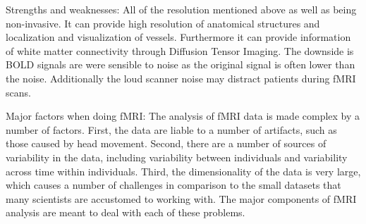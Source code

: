 Strengths and weaknesses: All of the resolution mentioned above as well as being non-invasive. It can provide high resolution of anatomical structures and localization and visualization of vessels. Furthermore it can provide information of white matter connectivity through Diffusion Tensor Imaging. The downside is BOLD signals are were sensible to noise as the original signal is often lower than the noise. Additionally the loud scanner noise may distract patients during fMRI scans. 
\cite{Glover2011}

Major factors when doing fMRI:
The analysis of fMRI data is made complex by a number of factors. First, the data are liable to a number of artifacts, such as those caused by head movement. Second, there are a number of sources of variability in the data, including variability between individuals and variability across time within individuals. Third, the dimensionality of the data is very large, which causes a number of challenges in comparison to the small datasets that many scientists are accustomed to working with. The major components of fMRI analysis are meant to deal with each of these problems. \cite{Glover2011} 
